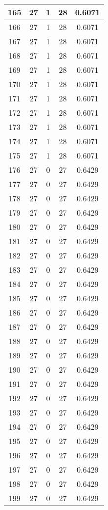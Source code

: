 \documentclass[letterpaper, 12pt]{article}
\begin{document}
\begin{longtable}{|c|c|c|c|c|}
\hline
165 & 27 & 1 & 28 & 0.6071 \\
\hline
166 & 27 & 1 & 28 & 0.6071 \\
\hline
167 & 27 & 1 & 28 & 0.6071 \\
\hline
168 & 27 & 1 & 28 & 0.6071 \\
\hline
169 & 27 & 1 & 28 & 0.6071 \\
\hline
170 & 27 & 1 & 28 & 0.6071 \\
\hline
171 & 27 & 1 & 28 & 0.6071 \\
\hline
172 & 27 & 1 & 28 & 0.6071 \\
\hline
173 & 27 & 1 & 28 & 0.6071 \\
\hline
174 & 27 & 1 & 28 & 0.6071 \\
\hline
175 & 27 & 1 & 28 & 0.6071 \\
\hline
176 & 27 & 0 & 27 & 0.6429 \\
\hline
177 & 27 & 0 & 27 & 0.6429 \\
\hline
178 & 27 & 0 & 27 & 0.6429 \\
\hline
179 & 27 & 0 & 27 & 0.6429 \\
\hline
180 & 27 & 0 & 27 & 0.6429 \\
\hline
181 & 27 & 0 & 27 & 0.6429 \\
\hline
182 & 27 & 0 & 27 & 0.6429 \\
\hline
183 & 27 & 0 & 27 & 0.6429 \\
\hline
184 & 27 & 0 & 27 & 0.6429 \\
\hline
185 & 27 & 0 & 27 & 0.6429 \\
\hline
186 & 27 & 0 & 27 & 0.6429 \\
\hline
187 & 27 & 0 & 27 & 0.6429 \\
\hline
188 & 27 & 0 & 27 & 0.6429 \\
\hline
189 & 27 & 0 & 27 & 0.6429 \\
\hline
190 & 27 & 0 & 27 & 0.6429 \\
\hline
191 & 27 & 0 & 27 & 0.6429 \\
\hline
192 & 27 & 0 & 27 & 0.6429 \\
\hline
193 & 27 & 0 & 27 & 0.6429 \\
\hline
194 & 27 & 0 & 27 & 0.6429 \\
\hline
195 & 27 & 0 & 27 & 0.6429 \\
\hline
196 & 27 & 0 & 27 & 0.6429 \\
\hline
197 & 27 & 0 & 27 & 0.6429 \\
\hline
198 & 27 & 0 & 27 & 0.6429 \\
\hline
199 & 27 & 0 & 27 & 0.6429 \\
\hline
\end{longtable}
\end{document}
